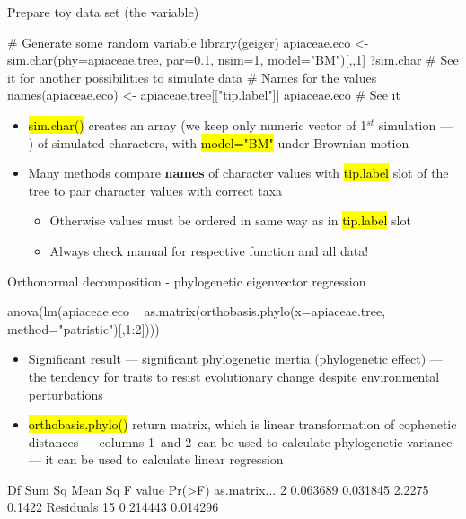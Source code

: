 \documentclass[compress, ucs, xelatex, 11pt, xcolor=svgnames,
	hyperref={
		bookmarks=true,
		unicode=true,
		colorlinks=true,
		pdftitle={Molecular data in R},
		plainpages=false,
		pdfauthor={Vojtech Zeisek},
		pdfsubject={Course about phylogeny and evolution in R},
		pdfcreator={XeLaTeX},
		pdfkeywords={R, evolution, phylogeny, molecular data},
		linkcolor=Tomato,
		anchorcolor=SaddleBrown,
		citecolor=Goldenrod,
		filecolor=DarkMagenta,
		menucolor=Sienna,
		urlcolor=DarkTurquoise,
		pdftex},
	url={hyphens, lowtilde} %
	]{beamer}
\renewcommand{\texttt}[1]{\hl{\ttfamily #1}}
\begin{document}
\begin{frame}[fragile]{Prepare toy data set (the variable)}
	\begin{spluscode}
    # Generate some random variable
    library(geiger)
    apiaceae.eco <- sim.char(phy=apiaceae.tree, par=0.1, nsim=1,
      model="BM")[,,1]
    ?sim.char # See it for another possibilities to simulate data
    # Names for the values
    names(apiaceae.eco) <- apiaceae.tree[["tip.label"]]
    apiaceae.eco # See it
	\end{spluscode}
	\begin{itemize}
		\item \texttt{sim.char()} creates an array (we keep only numeric vector of 1$^{st}$ simulation --- \texttt{[,,1]}) of simulated characters, with \texttt{model="BM"} under Brownian motion
		\item Many methods compare \textbf{names} of character values with \texttt{tip.label} slot of the tree to pair character values with correct taxa
		\begin{itemize}
			\item Otherwise values must be ordered in same way as in \texttt{tip.label} slot
			\item \alert{Always check manual for respective function and all data!}
		\end{itemize}
	\end{itemize}
\end{frame}

\begin{frame}[fragile]{Orthonormal decomposition - phylogenetic eigenvector regression}
	\begin{spluscode}
    anova(lm(apiaceae.eco ~ as.matrix(orthobasis.phylo(x=apiaceae.tree,
      method="patristic")[,1:2])))
	\end{spluscode}
	\begin{itemize}
		\item Significant result --- significant phylogenetic inertia (phylogenetic effect) --- the tendency for traits to resist evolutionary change despite environmental perturbations
		\item \texttt{orthobasis.phylo()} return matrix, which is linear transformation of cophenetic distances --- columns 1~and 2~can be used to calculate phylogenetic variance --- it can be used to calculate linear regression
	\end{itemize}
	\begin{spluscode}
                 Df   Sum Sq  Mean Sq F value Pr(>F)
    as.matrix...  2 0.063689 0.031845  2.2275 0.1422
    Residuals    15 0.214443 0.014296
	\end{spluscode}
\end{frame}
\end{document}
